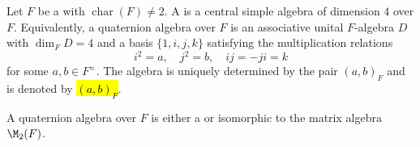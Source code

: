\begin{definition} \label{definition:quaternion_algebra_over_a_field}
    Let $F$ be a  with $\operatorname{char}(F) \neq 2$. A  is a central simple algebra of dimension $4$ over $F$. Equivalently, a quaternion algebra over $F$ is an associative unital $F$-algebra $D$ with $\dim_F D = 4$ and a basis $\{1, i, j, k\}$ satisfying the multiplication relations
    $$i^2 = a,\quad j^2 = b,\quad ij = -ji = k$$
    for some $a, b \in F^\times$. The algebra is uniquely determined by the pair $(a, b)_F$ and is denoted by \hl{$(a, b)_F$}.

    A quaternion algebra over $F$ is either a   or isomorphic to the matrix algebra $\M_2(F)$.
\end{definition}
